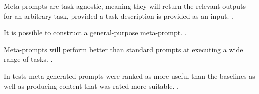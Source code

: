 Meta-prompts are task-agnostic, meaning they will return the relevant outputs for an arbitrary task, provided a task description is provided as an input.  \cite{dewynter2024metaprompting}.

It is possible to construct a general-purpose meta-prompt. \cite{dewynter2024metaprompting}.

Meta-prompts will perform better than standard prompts at executing a wide range of tasks.  \cite{dewynter2024metaprompting}.

In tests meta-generated prompts were ranked as more useful than the baselines as well as producing content that was rated more suitable.  \cite{dewynter2024metaprompting}.
